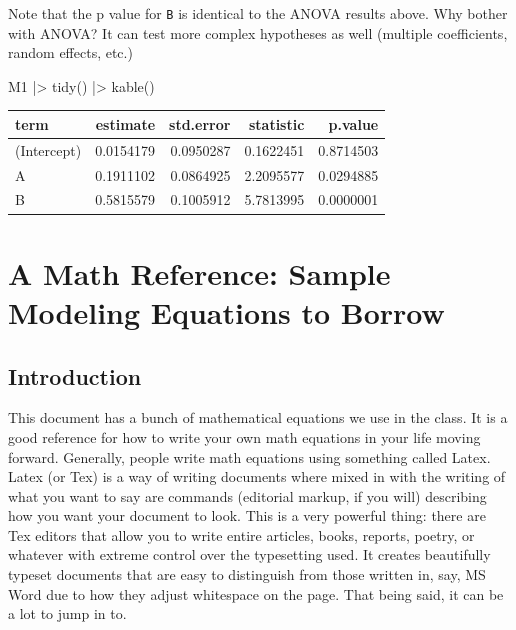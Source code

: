 \documentclass[
  letterpaper,
  DIV=11,
  numbers=noendperiod]{scrreprt}
\newenvironment{Shaded}{\begin{snugshade}}{\end{snugshade}}
\newcommand{\FunctionTok}[1]{\textcolor[rgb]{0.02,0.16,0.49}{#1}}
\newcommand{\NormalTok}[1]{\textcolor[rgb]{0.00,0.44,0.13}{#1}}
\newcommand{\SpecialCharTok}[1]{\textcolor[rgb]{0.25,0.44,0.63}{#1}}
\begin{document}
Note that the p value for \texttt{B} is identical to the ANOVA results
above. Why bother with ANOVA? It can test more complex hypotheses as
well (multiple coefficients, random effects, etc.)

\begin{Shaded}
\begin{Highlighting}[]
\NormalTok{M1 }\SpecialCharTok{|\textgreater{}} 
  \FunctionTok{tidy}\NormalTok{() }\SpecialCharTok{|\textgreater{}} 
  \FunctionTok{kable}\NormalTok{()}
\end{Highlighting}
\end{Shaded}

\begin{longtable}[]{@{}lrrrr@{}}
\toprule\noalign{}
term & estimate & std.error & statistic & p.value \\
\midrule\noalign{}
\endhead
\bottomrule\noalign{}
\endlastfoot
(Intercept) & 0.0154179 & 0.0950287 & 0.1622451 & 0.8714503 \\
A & 0.1911102 & 0.0864925 & 2.2095577 & 0.0294885 \\
B & 0.5815579 & 0.1005912 & 5.7813995 & 0.0000001 \\
\end{longtable}

\hypertarget{a-math-reference-sample-modeling-equations-to-borrow}{%
\chapter{A Math Reference: Sample Modeling Equations to
Borrow}\label{a-math-reference-sample-modeling-equations-to-borrow}}

\hypertarget{introduction}{%
\section{Introduction}\label{introduction}}

This document has a bunch of mathematical equations we use in the class.
It is a good reference for how to write your own math equations in your
life moving forward. Generally, people write math equations using
something called Latex. Latex (or Tex) is a way of writing documents
where mixed in with the writing of what you want to say are commands
(editorial markup, if you will) describing how you want your document to
look. This is a very powerful thing: there are Tex editors that allow
you to write entire articles, books, reports, poetry, or whatever with
extreme control over the typesetting used. It creates beautifully
typeset documents that are easy to distinguish from those written in,
say, MS Word due to how they adjust whitespace on the page. That being
said, it can be a lot to jump in to.
\end{document}
